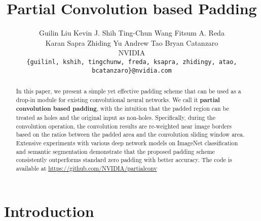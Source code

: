 \documentclass[10pt,twocolumn,letterpaper]{article}
\begin{document}
\title{Partial Convolution based Padding}

\author{Guilin Liu \quad Kevin J. Shih \quad Ting-Chun Wang \quad Fitsum A. Reda\\
Karan Sapra \quad Zhiding Yu \quad Andrew Tao \quad Bryan Catanzaro\\
NVIDIA\\
{\tt\small \{guilinl, kshih, tingchunw, freda, ksapra, zhidingy, atao, bcatanzaro\}@nvidia.com}}


\maketitle

\begin{abstract}
In this paper, we present a simple yet effective padding scheme that can be used as a drop-in module for existing convolutional neural networks. We call it \textbf{partial convolution based padding}, with the intuition that the padded region can be treated as holes and the original input as non-holes. Specifically, during the convolution operation, the convolution results are re-weighted near image borders based on the ratios between the padded area and the convolution sliding window area. Extensive experiments with various deep network models on ImageNet classification and semantic segmentation demonstrate that the proposed padding scheme consistently outperforms standard zero padding with better accuracy. The code is available at \href{https://github.com/NVIDIA/partialconv}{https://github.com/NVIDIA/partialconv}
\end{abstract}

\section{Introduction}
\end{document}
